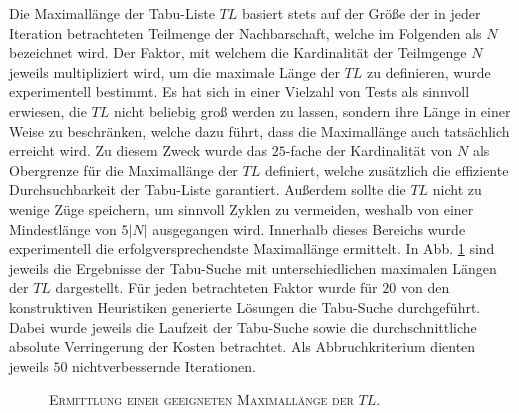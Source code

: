 Die Maximallänge der Tabu-Liste $TL$ basiert stets auf der Größe der in jeder Iteration betrachteten Teilmenge der
Nachbarschaft, welche im Folgenden als $N$ bezeichnet wird. Der Faktor, mit welchem die Kardinalität der Teilmgenge $N$ jeweils multipliziert wird, um die maximale Länge der $TL$ zu definieren, wurde experimentell bestimmt.
Es hat sich in einer Vielzahl von Tests als sinnvoll erwiesen, die $TL$ nicht beliebig groß werden zu lassen,
sondern ihre Länge in einer Weise zu beschränken, welche dazu führt, dass die Maximallänge auch tatsächlich
erreicht wird. Zu diesem Zweck wurde das $25$-fache der Kardinalität von $N$ als Obergrenze für die Maximallänge
der $TL$ definiert, welche zusätzlich die effiziente Durchsuchbarkeit der Tabu-Liste garantiert.
Außerdem sollte die $TL$ nicht zu wenige Züge speichern, um sinnvoll Zyklen zu vermeiden, weshalb von einer
Mindestlänge von $5|N|$ ausgegangen wird. Innerhalb dieses Bereichs wurde experimentell die erfolgversprechendste Maximallänge ermittelt. In Abb. \ref{fig:TL_experiments} sind jeweils die Ergebnisse der Tabu-Suche mit unterschiedlichen maximalen Längen der $TL$ dargestellt. Für jeden betrachteten Faktor wurde für $20$ von den konstruktiven Heuristiken generierte Lösungen die Tabu-Suche durchgeführt. Dabei wurde jeweils die Laufzeit der Tabu-Suche sowie die durchschnittliche absolute Verringerung der Kosten betrachtet.
Als Abbruchkriterium dienten jeweils $50$ nichtverbessernde Iterationen.

\begin{figure}[H]
\centering
{}
\caption{\textsc{Ermittlung einer geeigneten Maximallänge der $TL$}.}
\label{fig:TL_experiments}
\end{figure}

